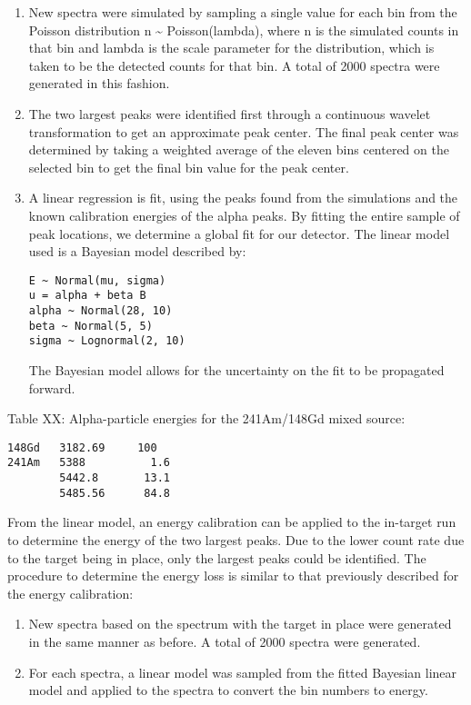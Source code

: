 \begin{enumerate}
\item
  New spectra were simulated by sampling a single value for each bin
  from the Poisson distribution n \textasciitilde{} Poisson(lambda),
  where n is the simulated counts in that bin and lambda is the scale
  parameter for the distribution, which is taken to be the detected
  counts for that bin. A total of 2000 spectra were generated in this
  fashion.
\item
  The two largest peaks were identified first through a continuous
  wavelet transformation to get an approximate peak center. The final
  peak center was determined by taking a weighted average of the eleven
  bins centered on the selected bin to get the final bin value for the
  peak center.
\item
  A linear regression is fit, using the peaks found from the simulations
  and the known calibration energies of the alpha peaks. By fitting the
  entire sample of peak locations, we determine a global fit for our
  detector. The linear model used is a Bayesian model described by:

\begin{verbatim}
E ~ Normal(mu, sigma)
u = alpha + beta B
alpha ~ Normal(28, 10)
beta ~ Normal(5, 5)
sigma ~ Lognormal(2, 10)
\end{verbatim}

  The Bayesian model allows for the uncertainty on the fit to be
  propagated forward.
\end{enumerate}

Table XX: Alpha-particle energies for the 241Am/148Gd mixed source:

\begin{verbatim}
148Gd   3182.69     100
241Am   5388          1.6
        5442.8       13.1
        5485.56      84.8
\end{verbatim}

From the linear model, an energy calibration can be applied to the
in-target run to determine the energy of the two largest peaks. Due to
the lower count rate due to the target being in place, only the largest
peaks could be identified. The procedure to determine the energy loss is
similar to that previously described for the energy calibration:

\begin{enumerate}
\tightlist
\item
  New spectra based on the spectrum with the target in place were
  generated in the same manner as before. A total of 2000 spectra were
  generated.
\item
  For each spectra, a linear model was sampled from the fitted Bayesian
  linear model and applied to the spectra to convert the bin numbers to
  energy.
\end{enumerate}

